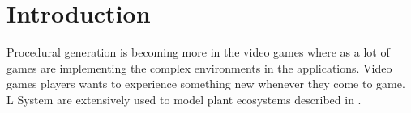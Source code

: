 \chapter{Introduction}

\large Procedural generation is becoming more in the video games where as a lot of games are implementing the complex environments in the applications. Video games players wants to experience something new whenever they come to game. L System are extensively used to model plant ecosystems described in \cite{parish2001procedural}.
